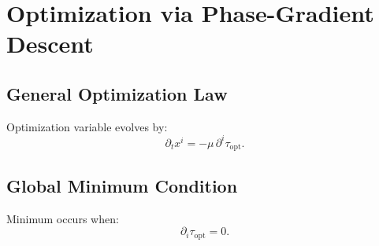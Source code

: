 \chapter{Optimization via Phase-Gradient Descent}

\section{General Optimization Law}
Optimization variable evolves by:
\[
\partial_t x^i = -\mu\,\partial^i\tau_{\mathrm{opt}}.
\]

\section{Global Minimum Condition}
Minimum occurs when:
\[
\partial_i \tau_{\mathrm{opt}} = 0.
\]

